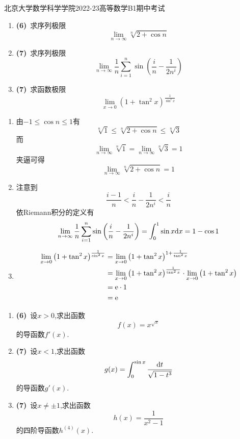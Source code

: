 \documentclass{ctexart}
\begin{document}
\pagestyle{empty}
\begin{center}\Large
    北京大学数学科学学院2022-23高等数学B1期中考试
\end{center}
\begin{problem}[1.(20\songti{分})]
    \begin{enumerate}[label=\textbf{(\arabic*)},leftmargin=*]
        \item \textbf{(6)}\ 求序列极限$$\lim_{n\to\infty}{\sqrt[n]{2+\cos n}}$$
        \item \textbf{(7)}\ 求序列极限$$\lim_{n\to\infty}{\dfrac{1}{n}\sum_{i=1}^{n}{\sin\left(\dfrac{i}{n}-\dfrac{1}{2n^i}\right)}}$$
        \item \textbf{(7)}\ 求函数极限$$\lim_{x\to0}{\left(1+\tan^2 x\right)^{\frac{1}{\sin^2 x}}}$$
    \end{enumerate}
\end{problem}
\begin{solution}
    \begin{enumerate}[label=\textbf{(\arabic*)},leftmargin=*]
        \item 由$-1\leqslant \cos n\leqslant 1$有
            $$\sqrt[n]{1}\leqslant\sqrt[n]{2+\cos n}\leqslant\sqrt[n]{3}$$
            而$$\lim_{n\to\infty}{\sqrt[n]{1}}=\lim_{n\to\infty}{\sqrt[n]{3}}=1$$
            夹逼可得$$\lim_{n\to\infty}{\sqrt[n]{2+\cos n}}=1$$
        \item 注意到$$\dfrac{i-1}{n}<\dfrac{i}{n}-\dfrac{1}{2n^i}<\dfrac{i}{n}$$
            依Riemann积分的定义有
            $$\lim_{n\to\infty}{\dfrac{1}{n}\sum_{i=1}^{n}{\sin\left(\dfrac{i}{n}-\dfrac{1}{2n^i}\right)}}=\int_0^1{\sin x\mathrm{d} x}=1-\cos1$$
        \item \begin{align*}
                \lim_{x\to0}{\left(1+\tan^2 x\right)^{\frac{1}{\sin^2 x}}}
                &= \lim_{x\to0}{\left(1+\tan^2 x\right)^{1+\frac{1}{\tan^2 x}}} \\
                &= \lim_{x\to0}{\left(1+\tan^2 x\right)^{\frac{1}{\tan^2 x}}}\cdot\lim_{x\to0}{\left(1+\tan^2 x\right)} \\
                &= \mathrm{e}\cdot 1 \\
                &= \mathrm{e}
            \end{align*}
    \end{enumerate}
\end{solution}
\begin{problem}[2.(20\songti{分})]
    \begin{enumerate}[label=\textbf{(\arabic*)},leftmargin=*]
        \item \textbf{(6)}\ 设$x>0$,求出函数$$f(x)=x^{\sqrt{x}}$$的导函数$f'(x)$.
        \item \textbf{(7)}\ 设$x<1$,求出函数$$g(x)=\int_0^{\sin x}\dfrac{\mathrm{d} t}{\sqrt{1-t^3}}$$的导函数$g'(x)$.
        \item \textbf{(7)}\ 设$x\neq\pm 1$,求出函数$$h(x)=\dfrac{1}{x^2-1}$$的四阶导函数$h^{(4)}(x)$.
    \end{enumerate}
\end{problem}
\end{document}
